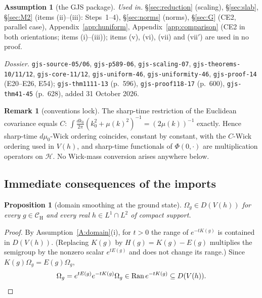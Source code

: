 \documentclass[11pt,a4paper]{article}
\theoremstyle{plain}
\newtheorem{proposition}[theorem]{Proposition}
\theoremstyle{definition}
\newtheorem{remark}[theorem]{Remark}
\newtheorem{assumption}{Assumption}
\theoremstyle{plain}
\theoremstyle{definition}
\newcommand{\CH}{\mathcal{C}_{\mathrm H}}
\newcommand{\HH}{\mathcal{H}}
\newcommand{\Om}{\Omega}
\DeclareMathOperator{\Ran}{Ran}
\begin{document}
\begin{assumption}[the GJS package]
\emph{Used in.} \S\ref{sec:reduction} (scaling), \S\ref{sec:slab}, \S\ref{sec:M2}
(items (ii)--(iii): Steps~1--4), \S\ref{sec:norms} (norms), \S\ref{sec:G} (CE2, parallel case), Appendix~\ref{app:huniform},
Appendix~\ref{app:comparison} (CE2 in both orientations; items (i)--(iii)); items (v),
(vi), (vii) and (vii$'$) are used in no proof.

{\raggedright\emph{Dossier.} \texttt{gjs-source-05/06}, \texttt{gjs-p589-06}, \texttt{gjs-scaling-07},
\texttt{gjs-theorems-10/11/12}, \texttt{gjs-core-11/12}, \texttt{gjs-uniform-46},
\texttt{gjs-uniformity-46}, \texttt{gjs-proof-14} (E20--E26, E54);
\texttt{gjs-thm1111-13} (p.~596), \texttt{gjs-proof118-17} (p.~600), \texttt{gjs-thm41-45}
(p.~628), added 31 October 2026.\par}
\end{assumption}

\begin{remark}[conventions lock]\label{rem:conv}
The sharp-time restriction of the Euclidean covariance equals $C$:
$\int\frac{dk_0}{2\pi}(k_0^2+\mu(k)^2)^{-1}=(2\mu(k))^{-1}$ exactly. Hence sharp-time
$d\mu_0$-Wick ordering coincides, constant by constant, with the $C$-Wick ordering used in
$V(h)$, and sharp-time functionals of $\Phi(0,\cdot)$ are multiplication operators on $\HH$.
No Wick-mass conversion arises anywhere below.
\end{remark}

\subsection{Immediate consequences of the imports}\label{subsec:consequences}

\begin{proposition}[domain smoothing at the ground state]\label{prop:smoothing}
$\Om_g\in D(V(h))$ for every $g\in\CH$ and every real $h\in L^1\cap L^2$ of compact support.
\end{proposition}

\begin{proof}
By Assumption~\ref{A:domain}(i), for $t>0$ the range of $e^{-tK(g)}$ is contained in
$D(V(h))$. (Replacing $K(g)$ by $H(g)=K(g)-E(g)$ multiplies the semigroup by the nonzero
scalar $e^{tE(g)}$ and does not change its range.) Since $K(g)\Om_g=E(g)\Om_g$,
\[
  \Om_g=e^{tE(g)}e^{-tK(g)}\Om_g\in\Ran e^{-tK(g)}\subseteq D(V(h)) .\qedhere
\]
\end{proof}
\end{document}

